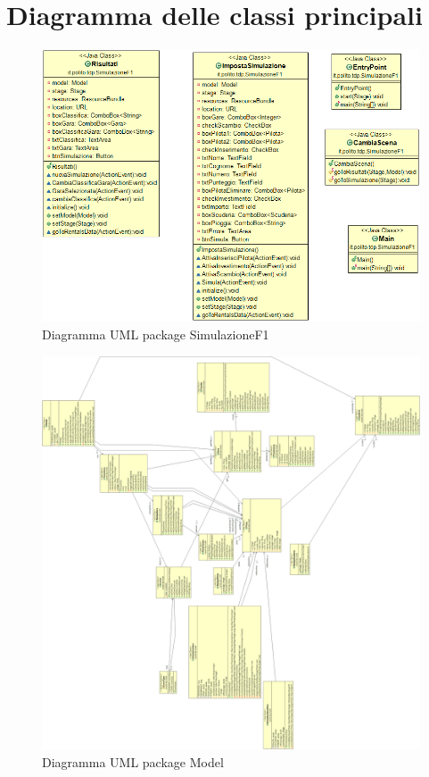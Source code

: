 \chapter{Diagramma delle classi principali}
\label{sec:Diagramma delle classi principali}


\begin{figure}[h]
\centering
\includegraphics[width=1\linewidth]{images/Diagramma UML package SimulazioneF1.png}
\caption{Diagramma UML package SimulazioneF1}
\label{fig:Diagramma UML package SimulazioneF1}
\end{figure}

\begin{figure}[h]
\centering
\includegraphics[width=1\linewidth]{images/Diagramma UML package Model2.png}
\caption{Diagramma UML package Model}
\label{fig:Diagramma UML package Model}
\end{figure}

